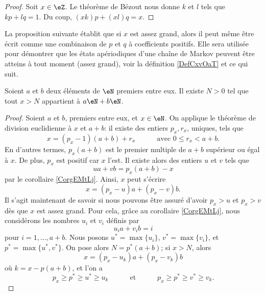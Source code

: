 \begin{proof}
    Soit \( x\in \eZ\). Le théorème de Bézout nous donne \( k\) et \( l\) tels que \( kp+lq=1\). Du coup, \( (xk)p+(xl)q=x\).
\end{proof}

La proposition suivante établit que si \( x\) est assez grand, alors il peut même être écrit comme une combinaison de \( p\) et \( q\) à coefficients positifs. Elle sera utilisée pour démontrer que les états apériodiques d'une chaîne de Markov peuvent être atteins à tout moment (assez grand), voir la définition \ref{DefCxvOaT} et ce qui suit.
\begin{proposition}     \label{PropLAbRSE}
    Soient \( a\) et \( b\) deux éléments de \( \eN\) premiers entre eux. Il existe \( N>0\) tel que tout \( x>N\) appartient à \( a\eN+b\eN\).
\end{proposition}

\begin{proof}
    Soient \( a\) et \( b\), premiers entre eux, et \( x\in \eN\). On applique le théorème de division euclidienne à $x$ et \( a + b \): il existe des entiers \( p_x, r_x \), uniques, tels que 
    \begin{equation*}
       x = (p_x-1)(a+b) + r_x\hspace{3em}\text{avec }0 \leq r_x < a+b.
    \end{equation*}
    En d'autres termes, \( p_x(a+b)\) est le premier multiple de \( a+b\) supérieur ou égal à $x$. De plus, $p_x$ est positif car $x$ l'est. Il existe alors des entiers $u$ et $v$ tels que
    \begin{equation*}
        ua + vb = p_x(a+b) - x
    \end{equation*}
    par le corollaire \ref{CorgEMtLj}. Ainsi, $x$ peut s'écrire
    \begin{equation*}
        x = (p_x - u) a + (p_x - v) b.
    \end{equation*}
    Il s'agit maintenant de savoir si nous pouvons être assuré d'avoir \( p_x > u\) et \( p_x > v\) dès que \( x\) est assez grand. Pour cela, grâce au corollaire \ref{CorgEMtLj}, nous considérons les nombres \( u_i\) et \( v_i\) définis par
    \begin{equation*}
        u_ia+v_ib=i
    \end{equation*}
    pour \( i=1,\ldots, a+b\). Nous posons \( u^*=\max\{ u_i \}\), \( v^*=\max\{ v_i   \}\), et \( p^*=\max\{ u^*,v^* \}\).  On pose alors \( N = p^*(a+b)\); si \( x>N \), alors
    \begin{equation*}
        x= (p_x - u_k) a + (p_x - v_k) b
    \end{equation*}
    où \( k=x-p(a+b)\), et l'on a
    \begin{equation*}
       p_x \geq p^* \geq u^* \geq u_k\hspace{3em}\text{et}\hspace{3em}p_x \geq p^* \geq v^* \geq v_k.
     \end{equation*}
\end{proof}



